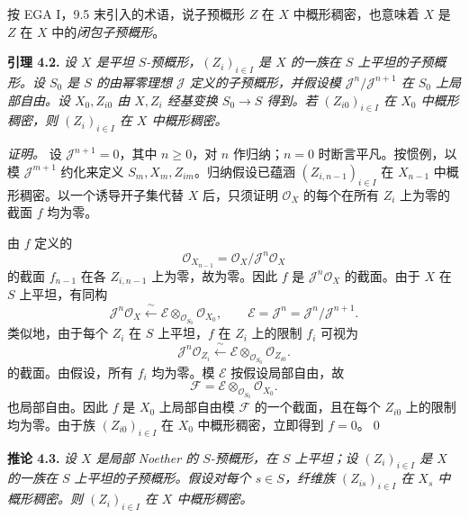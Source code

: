 按 EGA I，9.5 末引入的术语，说子预概形 \(Z\) 在 \(X\) 中概形稠密，也意味着 \(X\) 是 \(Z\) 在 \(X\) 中的\emph{闭包子预概形}。

\medskip
\noindent{}\textbf{引理 4.2.}
\textit{设 \(X\) 是平坦 \(S\)-预概形，\((Z_i)_{i\in I}\) 是 \(X\) 的一族在 \(S\) 上平坦的子预概形。设 \(S_0\) 是 \(S\) 的由幂零理想 \(\mathscr J\) 定义的子预概形，并假设模 \(\mathscr J^n/\mathscr J^{n+1}\) 在 \(S_0\) 上局部自由。设 \(X_0,Z_{i0}\) 由 \(X,Z_i\) 经基变换 \(S_0\to S\) 得到。若 \((Z_{i0})_{i\in I}\) 在 \(X_0\) 中概形稠密，则 \((Z_i)_{i\in I}\) 在 \(X\) 中概形稠密。}

\emph{证明。}
设 \(\mathscr J^{n+1}=0\)，其中 \(n\geq0\)，对 \(n\) 作归纳；\(n=0\) 时断言平凡。按惯例，以模 \(\mathscr J^{m+1}\) 约化来定义 \(S_m,X_m,Z_{im}\)。归纳假设已蕴涵 \((Z_{i,n-1})_{i\in I}\) 在 \(X_{n-1}\) 中概形稠密。以一个诱导开子集代替 \(X\) 后，只须证明 \(\mathscr O_X\) 的每个在所有 \(Z_i\) 上为零的截面 \(f\) 均为零。

由 \(f\) 定义的
\[
  \mathscr O_{X_{n-1}}
  =\mathscr O_X/\mathscr J^n\mathscr O_X
\]
的截面 \(f_{n-1}\) 在各 \(Z_{i,n-1}\) 上为零，故为零。因此 \(f\) 是 \(\mathscr J^n\mathscr O_X\) 的截面。由于 \(X\) 在 \(S\) 上平坦，有同构
\[
  \mathscr J^n\mathscr O_X
  \xleftarrow{\ \sim\ }
  \mathscr E\otimes_{\mathscr O_{S_0}}\mathscr O_{X_0},
  \qquad
  \mathscr E=\mathscr J^n=\mathscr J^n/\mathscr J^{n+1}.
\]
类似地，由于每个 \(Z_i\) 在 \(S\) 上平坦，\(f\) 在 \(Z_i\) 上的限制 \(f_i\) 可视为
\[
  \mathscr J^n\mathscr O_{Z_i}
  \xleftarrow{\ \sim\ }
  \mathscr E\otimes_{\mathscr O_{S_0}}\mathscr O_{Z_{i0}}.
\]
的截面。由假设，所有 \(f_i\) 均为零。模 \(\mathscr E\) 按假设局部自由，故
\[
  \mathscr F
  =\mathscr E\otimes_{\mathscr O_{S_0}}\mathscr O_{X_0}.
\]
也局部自由。因此 \(f\) 是 \(X_0\) 上局部自由模 \(\mathscr F\) 的一个截面，且在每个 \(Z_{i0}\) 上的限制均为零。由于族 \((Z_{i0})_{i\in I}\) 在 \(X_0\) 中概形稠密，立即得到 \(f=0\)。\qed

\medskip
\noindent{}\textbf{推论 4.3.}
\textit{设 \(X\) 是局部 Noether 的 \(S\)-预概形，在 \(S\) 上平坦；设 \((Z_i)_{i\in I}\) 是 \(X\) 的一族在 \(S\) 上平坦的子预概形。假设对每个 \(s\in S\)，纤维族 \((Z_{is})_{i\in I}\) 在 \(X_s\) 中概形稠密。则 \((Z_i)_{i\in I}\) 在 \(X\) 中概形稠密。}

